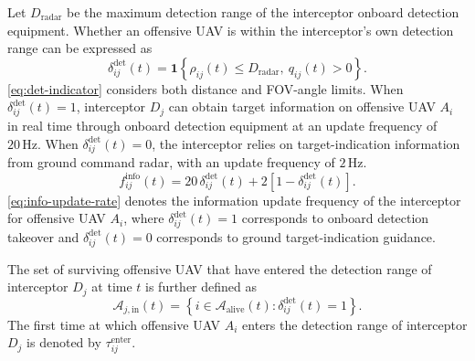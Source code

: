 \documentclass{cja}
\begin{document}
Let $D_{\mathrm{radar}}$ be the maximum detection range of the interceptor onboard detection equipment. Whether an offensive UAV is within the interceptor's own detection range can be expressed as
\begin{equation}
\delta_{ij}^{\mathrm{det}}(t)
=
\mathbf{1}
\left\{
\rho_{ij}(t)\le D_{\mathrm{radar}},\
q_{ij}(t)>0
\right\}.
\label{eq:det-indicator}
\end{equation}
\eqref{eq:det-indicator} considers both distance and FOV-angle limits. When $\delta_{ij}^{\mathrm{det}}(t)=1$, interceptor $D_j$ can obtain target information on offensive UAV $A_i$ in real time through onboard detection equipment at an update frequency of $20\,\mathrm{Hz}$. When $\delta_{ij}^{\mathrm{det}}(t)=0$, the interceptor relies on target-indication information from ground command radar, with an update frequency of $2\,\mathrm{Hz}$.
\begin{equation}
f_{ij}^{\mathrm{info}}(t)
=
20\,\delta_{ij}^{\mathrm{det}}(t)
+
2\left[1-\delta_{ij}^{\mathrm{det}}(t)\right].
\label{eq:info-update-rate}
\end{equation}
\eqref{eq:info-update-rate} denotes the information update frequency of the interceptor for offensive UAV $A_i$, where $\delta_{ij}^{\mathrm{det}}(t)=1$ corresponds to onboard detection takeover and $\delta_{ij}^{\mathrm{det}}(t)=0$ corresponds to ground target-indication guidance.

The set of surviving offensive UAV that have entered the detection range of interceptor $D_j$ at time $t$ is further defined as
\begin{equation}
\mathcal A_{j,\mathrm{in}}(t)
=
\left\{
i\in\mathcal A_{\mathrm{alive}}(t):
\delta_{ij}^{\mathrm{det}}(t)=1
\right\}.
\label{eq:in-detect-set}
\end{equation}
The first time at which offensive UAV $A_i$ enters the detection range of interceptor $D_j$ is denoted by $\tau_{ij}^{\mathrm{enter}}$.
\end{document}
